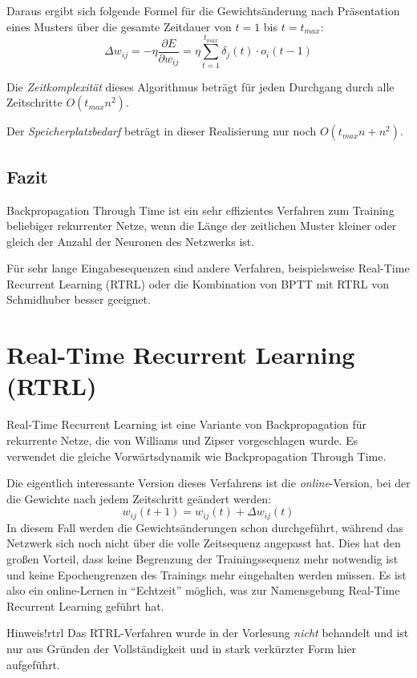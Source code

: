 \noindent
Daraus ergibt sich folgende Formel für die Gewichtsänderung nach Präsentation eines Musters über die gesamte Zeitdauer von $t=1$ bis $t=t_{max}$:
\[
	\Delta w_{ij} = - \eta \frac{\partial E}{\partial w_{ij}} =
		\eta \sum_{t=1}^{t_{max}} \delta_j(t) \cdot o_i(t-1)
\]

Die \emph{Zeitkomplexität} dieses Algorithmus beträgt für jeden Durchgang durch alle Zeitschritte $O(t_{max} n^2)$.

Der \emph{Speicherplatzbedarf} beträgt in dieser Realisierung nur noch $O(t_{max} n + n^2)$.

\subsection*{Fazit}
Backpropagation Through Time ist ein sehr effizientes Verfahren zum Training beliebiger rekurrenter Netze, wenn die Länge der zeitlichen Muster kleiner oder gleich der Anzahl der Neuronen des Netzwerks ist.

Für sehr lange Eingabesequenzen sind andere Verfahren, beispielsweise Real-Time Recurrent Learning (RTRL) oder die Kombination von BPTT mit RTRL von Schmidhuber besser geeignet.


\section*{Real-Time Recurrent Learning (RTRL)}
Real-Time Recurrent Learning ist eine Variante von Backpropagation für rekurrente Netze, die von Williams und Zipser vorgeschlagen wurde. Es verwendet die gleiche Vorwärtsdynamik wie Backpropagation Through Time.

Die eigentlich interessante Version dieses Verfahrens ist die \emph{online}-Version, bei der die Gewichte nach jedem Zeitschritt geändert werden:
\[
	w_{ij}(t+1) = w_{ij}(t) + \Delta w_{ij}(t)
\]
In diesem Fall werden die Gewichtsänderungen schon durchgeführt, während das Netzwerk sich noch nicht über die volle Zeitsequenz angepasst hat. Dies hat den großen Vorteil, dass keine Begrenzung der Trainingssequenz mehr notwendig ist und keine Epochengrenzen des Trainings mehr eingehalten werden müssen. 
Es ist also ein online-Lernen in "`Echtzeit"' möglich, was zur Namensgebung Real-Time Recurrent Learning geführt hat.

\begin{hint}{Hinweis!}{rtrl}
	Das RTRL-Verfahren wurde in der Vorlesung \emph{nicht} behandelt und ist nur aus Gründen der Vollständigkeit und in stark verkürzter Form hier aufgeführt.
\end{hint}

